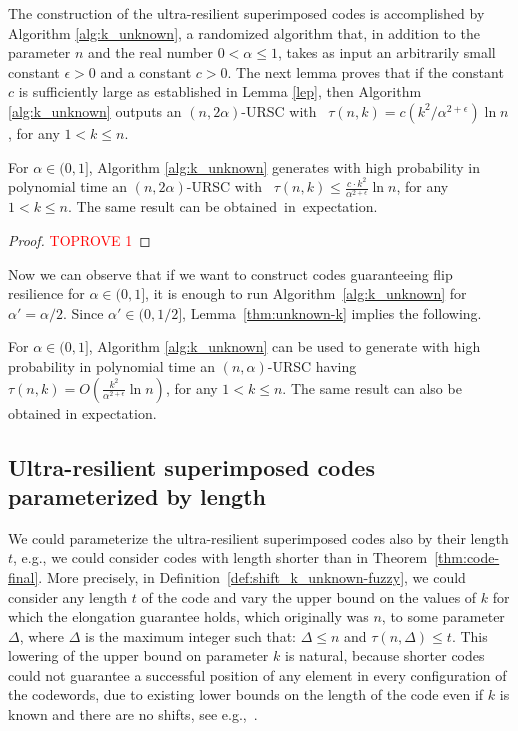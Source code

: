 \documentclass[11pt]{article}
\begin{document}
The construction of the ultra-resilient superimposed codes is accomplished by Algorithm \ref{alg:k_unknown}, 
a randomized algorithm that, in addition to the parameter $n$ and the real number $0 < \alpha \le 1$,
takes as input an arbitrarily small constant $\epsilon > 0$ and a constant $c > 0$. 
The next lemma proves that if the constant $c$ is  
sufficiently large as established in Lemma \ref{lep}, then Algorithm \ref{alg:k_unknown}
outputs an $(n, 2\alpha)$-URSC with \elongation\ 
$\tau(n,k) = c (k^2/\alpha^{2+\epsilon})\ln n$, for any $1 < k \le n$.


\begin{lemma}
\label{thm:unknown-k}
For 
$\alpha\in(0,1]$, Algorithm \ref{alg:k_unknown} generates with high probability in polynomial time 
an $(n, 2\alpha)$-URSC with \elongation\ 
$\tau(n,k) \le \frac{c\cdot k^2}{\alpha^{2+\epsilon}} \ln n$, for any $1 < k \le n$. 
The same 
result 
can 
be obtained~in~expectation.
\end{lemma}

\begin{proof}\textcolor{red}{TOPROVE 1}\end{proof}

Now we can observe that if we want to construct codes guaranteeing flip resilience for $\alpha\in (0,1]$, 
it is enough to run Algorithm~\ref{alg:k_unknown} for $\alpha'=\alpha/2$. Since 
$\alpha'\in (0,1/2]$, Lemma~\ref{thm:unknown-k} implies the following.



\begin{theorem}
\label{thm:code-final}
For 
$\alpha \in (0, 1]$, Algorithm \ref{alg:k_unknown} can be used to generate with high probability 
in polynomial time an $(n, \alpha)$-URSC having \elongation\
$\tau(n, k) = O\left(\frac{k^2}{\alpha^{2 + \epsilon}} \ln n\right)$,
for any $1 < k \leq n$. The same result can also be obtained in expectation.
\end{theorem}


\subsection{Ultra-resilient superimposed codes parameterized by length}

We could parameterize the ultra-resilient superimposed codes also by their length $t$, e.g., we could consider codes with length shorter than in Theorem~\ref{thm:code-final}.
More precisely, in Definition~\ref{def:shift_k_unknown-fuzzy}, we could consider any length $t$ of the code and vary the upper bound on the values of $k$ for which 
the elongation guarantee holds, which originally was $n$, to some parameter $\Delta$, where $\Delta$ is the maximum integer such that: 
$\Delta\le n$ and 
$\tau(n,\Delta)\le t$. This lowering of the upper bound on parameter $k$ is natural, because shorter codes could not guarantee a successful position of any element in every configuration of the codewords, due to existing lower bounds on the length of the code even if $k$ is known and there are no shifts, see e.g.,~\cite{AV1982}.
\end{document}
